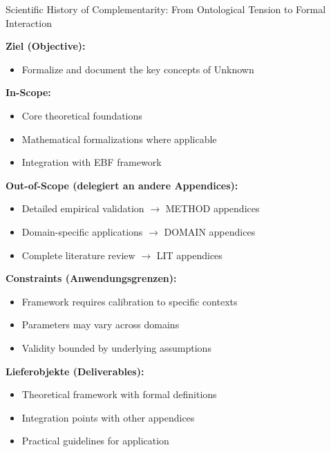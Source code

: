\begin{chapter}{Scientific History of Complementarity: From Ontological Tension to Formal Interaction}

\begin{tcolorbox}[
    colback=orange!5!white,
    colframe=orange!75!black,
    title={\textbf{Appendix Scope: Ziel / In-Scope / Out-of-Scope / Constraints}},
    fonttitle=\bfseries
]

\textbf{Ziel (Objective):}
\begin{itemize}[nosep]
    \item Formalize and document the key concepts of Unknown
\end{itemize}

\textbf{In-Scope:}
\begin{itemize}[nosep]
    \item Core theoretical foundations
    \item Mathematical formalizations where applicable
    \item Integration with EBF framework
\end{itemize}

\textbf{Out-of-Scope (delegiert an andere Appendices):}
\begin{itemize}[nosep]
    \item Detailed empirical validation $\rightarrow$ METHOD appendices
    \item Domain-specific applications $\rightarrow$ DOMAIN appendices
    \item Complete literature review $\rightarrow$ LIT appendices
\end{itemize}

\textbf{Constraints (Anwendungsgrenzen):}
\begin{itemize}[nosep]
    \item Framework requires calibration to specific contexts
    \item Parameters may vary across domains
    \item Validity bounded by underlying assumptions
\end{itemize}

\textbf{Lieferobjekte (Deliverables):}
\begin{itemize}[nosep]
    \item Theoretical framework with formal definitions
    \item Integration points with other appendices
    \item Practical guidelines for application
\end{itemize}


\end{tcolorbox}
\end{chapter}
